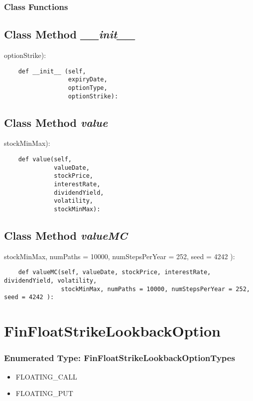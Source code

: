 \documentclass[twoside,11pt]{book}
\begin{document}
\subsubsection{Class Functions}

\subsection{Class Method {\it \_\_init\_\_ }}
optionStrike):

\begin{lstlisting}
    def __init__ (self,
                  expiryDate,
                  optionType, 
                  optionStrike):
\end{lstlisting}

\subsection{Class Method {\it value}}
stockMinMax):

\begin{lstlisting}
    def value(self,
              valueDate,
              stockPrice,
              interestRate,
              dividendYield,
              volatility, 
              stockMinMax):
\end{lstlisting}

\subsection{Class Method {\it valueMC}}
stockMinMax, numPaths = 10000, numStepsPerYear = 252, seed = 4242 ):

\begin{lstlisting}
    def valueMC(self, valueDate, stockPrice, interestRate, dividendYield, volatility, 
                stockMinMax, numPaths = 10000, numStepsPerYear = 252, seed = 4242 ):
\end{lstlisting}

\newpage
\section{FinFloatStrikeLookbackOption}

\subsubsection{Enumerated Type: FinFloatStrikeLookbackOptionTypes}
\begin{itemize}
\item{FLOATING\_CALL}
\item{FLOATING\_PUT}
\end{itemize}
\end{document}
